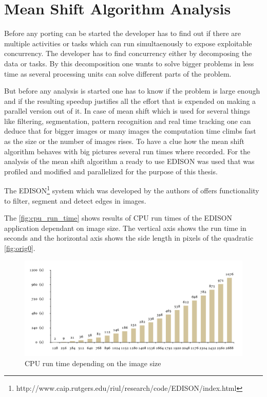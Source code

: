\chapter{Mean Shift Algorithm Analysis} %
\label{cha:algorithm_analysis}
Before any porting can be started the developer has to find out if there are 
multiple activities or tasks which can run simultaenously to expose exploitable 
concurrency. The developer has to find concurrency either by decomposing the  
data or tasks. By this decomposition one wants to solve bigger problems in less 
time as several processing units can solve different parts of the problem. 

But before any analysis is started one has to know if the problem is large enough
and if the resulting speedup justifies all the effort that is expended on making
a parallel version out of it. In case of mean shift which is used for several 
things like filtering, segmentation, pattern recognition and real time tracking
one can deduce that for bigger images or many images the computation time climbs
fast as the size or the number of images rises. To have a clue how the mean 
shift algorithm behaves with big pictures several run times where recorded.
For the analysis of the mean shift algorithm a ready to use \gls{EDISON} 
was used that was profiled and modified and parallelized for the purpose of this 
thesis.

The
\gls{EDISON}\footnote{http://www.caip.rutgers.edu/riul/research/code/EDISON/index.html}
system which was developed by the authors  \citeauthor{citeulike:462300} of
\citep{citeulike:462300} offers functionality to filter, segment and detect
edges in images. 

The \autoref{fig:cpu_run_time}
shows results of \gls{CPU} run times of the \gls{EDISON} application dependant
on image size. The vertical axis shows the run time in seconds and the
horizontal axis shows the side length in pixels of the quadratic \autoref{fig:orig0}.

\begin{figure}[ht]
\centering
\includegraphics[width=390pt]{gfx/cpu_run_time}
\caption{CPU run time depending on the image size}
\label{fig:cpu_run_time}
\end{figure}

